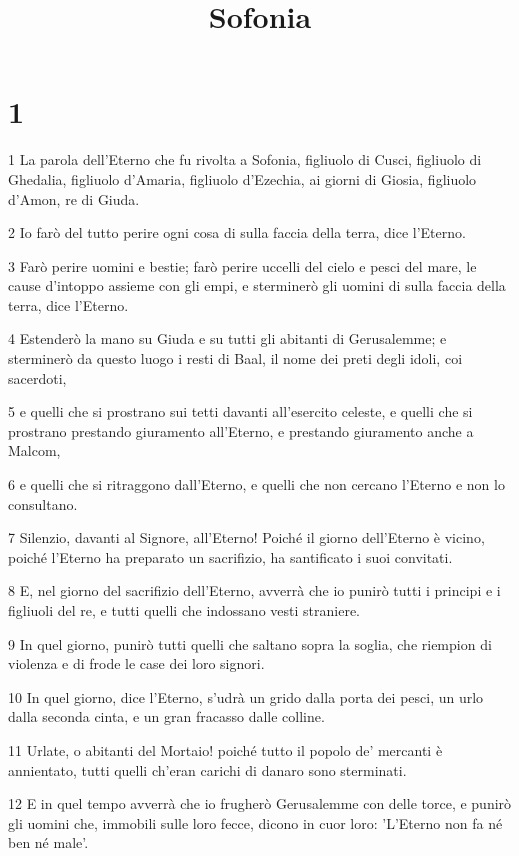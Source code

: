 

\title{Sofonia}


\chapter{1}

\par 1 La parola dell'Eterno che fu rivolta a Sofonia, figliuolo di Cusci, figliuolo di Ghedalia, figliuolo d'Amaria, figliuolo d'Ezechia, ai giorni di Giosia, figliuolo d'Amon, re di Giuda.
\par 2 Io farò del tutto perire ogni cosa di sulla faccia della terra, dice l'Eterno.
\par 3 Farò perire uomini e bestie; farò perire uccelli del cielo e pesci del mare, le cause d'intoppo assieme con gli empi, e sterminerò gli uomini di sulla faccia della terra, dice l'Eterno.
\par 4 Estenderò la mano su Giuda e su tutti gli abitanti di Gerusalemme; e sterminerò da questo luogo i resti di Baal, il nome dei preti degli idoli, coi sacerdoti,
\par 5 e quelli che si prostrano sui tetti davanti all'esercito celeste, e quelli che si prostrano prestando giuramento all'Eterno, e prestando giuramento anche a Malcom,
\par 6 e quelli che si ritraggono dall'Eterno, e quelli che non cercano l'Eterno e non lo consultano.
\par 7 Silenzio, davanti al Signore, all'Eterno! Poiché il giorno dell'Eterno è vicino, poiché l'Eterno ha preparato un sacrifizio, ha santificato i suoi convitati.
\par 8 E, nel giorno del sacrifizio dell'Eterno, avverrà che io punirò tutti i principi e i figliuoli del re, e tutti quelli che indossano vesti straniere.
\par 9 In quel giorno, punirò tutti quelli che saltano sopra la soglia, che riempion di violenza e di frode le case dei loro signori.
\par 10 In quel giorno, dice l'Eterno, s'udrà un grido dalla porta dei pesci, un urlo dalla seconda cinta, e un gran fracasso dalle colline.
\par 11 Urlate, o abitanti del Mortaio! poiché tutto il popolo de' mercanti è annientato, tutti quelli ch'eran carichi di danaro sono sterminati.
\par 12 E in quel tempo avverrà che io frugherò Gerusalemme con delle torce, e punirò gli uomini che, immobili sulle loro fecce, dicono in cuor loro: 'L'Eterno non fa né ben né male'.
